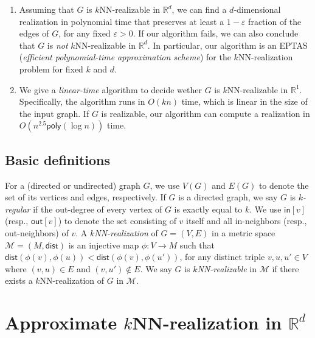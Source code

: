 \begin{enumerate}
\item Assuming that $G$ is $k$NN-realizable in $\mathbb{R}^d$, we can find a $d$-dimensional realization in polynomial time that preserves at least a $1 - \varepsilon$ fraction of the edges of $G$, for any fixed $\varepsilon > 0$.
If our algorithm fails, we can also conclude that $G$ is \emph{not} $k$NN-realizable in $\mathbb{R}^d$.
In particular, our algorithm is an EPTAS (\textit{efficient polynomial-time approximation scheme}) for the $k$NN-realization problem for fixed $k$ and $d$.

\smallskip

\item We give a \textit{linear-time} algorithm to decide wether $G$ is $k$NN-realizable in $\mathbb{R}^1$.
Specifically, the algorithm runs in $O(kn)$ time, which is linear in the size of the input graph.
If $G$ is realizable, our algorithm can compute a realization in $O(n^{2.5} \mathsf{poly}(\log n))$ time.
\end{enumerate}

\subsection{Basic definitions}

For a (directed or undirected) graph $G$, we use $V(G)$ and $E(G)$ to denote the set of its vertices and edges, respectively. If $G$ is a directed graph, we say $G$ is \textit{$k$-regular} if the out-degree of every vertex of $G$ is exactly equal to $k$. We use $\mathsf{in}[v]$ (resp., $\mathsf{out}[v]$) to denote the set consisting of $v$ itself and all in-neighbors (resp., out-neighbors) of $v$.
A \textit{$k$NN-realization} of $G = (V,E)$ in a metric space $\mathcal{M} = (M,\mathsf{dist})$ is an injective map $\phi: V \rightarrow M$ such that  $\mathsf{dist}(\phi(v),\phi(u)) < \mathsf{dist}(\phi(v),\phi(u'))$, for any distinct triple $v,u,u' \in V$ where $(v,u) \in E$ and $(v,u') \notin E$.
We say $G$ is \textit{$k$NN-realizable} in $\mathcal{M}$ if there exists a $k$NN-realization of $G$ in $\mathcal{M}$.

\section{Approximate \texorpdfstring{$k$}{k}NN-realization in \texorpdfstring{$\mathbb{R}^d$}{Rd}}

